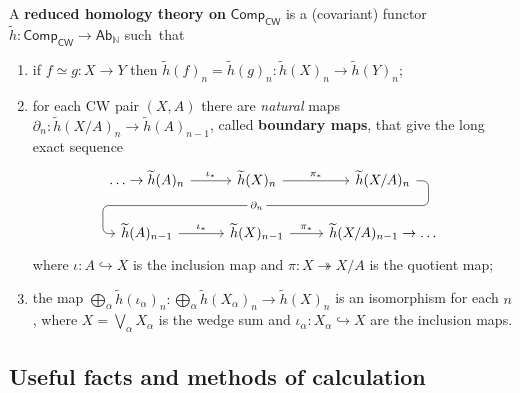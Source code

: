 \documentclass[10pt]{article}
\newcommand{\nn}{\mathbb{N}}
\newcommand{\reduced}[1]{\widetilde{#1}}
\begin{document}
            A \textbf{reduced homology theory on} $\mathsf{Comp_{CW}}$ is a (covariant) functor $\reduced{h}\colon\mathsf{Comp_{CW}}\to\mathsf{Ab}_\nn$ \mbox{such that}
            \begin{enumerate}
                \item if $f\simeq g\colon X\to Y$ then $\reduced{h}(f)_n=\reduced{h}(g)_n\colon\reduced{h}(X)_n\to\reduced{h}(Y)_n$;
                \item for each CW pair $(X,A)$ there are \emph{natural} maps $\partial_n\colon\reduced{h}(X/A)_n\to\reduced{h}(A)_{n-1}$, called \textbf{boundary maps}, that give the long exact sequence
                    \begin{equation*}
                        \begin{tikzcd}
                            \ldots\to\reduced{h}(A)_n \rar{\iota_*}
                            & \reduced{h}(X)_n \rar{\pi_*} \ar[draw=none]{d}[name=X, anchor=center]{}
                            & \reduced{h}(X/A)_n \ar[rounded corners,
                                    to path={ -- ([xshift=2ex]\tikztostart.east)
                                              |- (X.center) \tikztonodes
                                              -| ([xshift=-2ex]\tikztotarget.west)
                                              -- (\tikztotarget)}]{dll}[description, at end]{\partial_n} \\
                            \reduced{h}(A)_{n-1} \rar{\iota_*}
                            & \reduced{h}(X)_{n-1} \rar{\pi_*}
                            & \reduced{h}(X/A)_{n-1}\to\ldots
                        \end{tikzcd}
                    \end{equation*}
                    where $\iota\colon A\hookrightarrow X$ is the inclusion map and $\pi\colon X\twoheadrightarrow X/A$ is the quotient map;
                \item the map $\bigoplus_\alpha\reduced{h}(\iota_\alpha)_n\colon\bigoplus_\alpha\reduced{h}(X_\alpha)_n\to\reduced{h}(X)_n$ is an isomorphism for each $n$, where $X=\bigvee_\alpha X_\alpha$ is the wedge sum and $\iota_\alpha\colon X_\alpha\hookrightarrow X$ are the inclusion maps.
            \end{enumerate}

        \subsection{Useful facts and methods of calculation}
\end{document}
